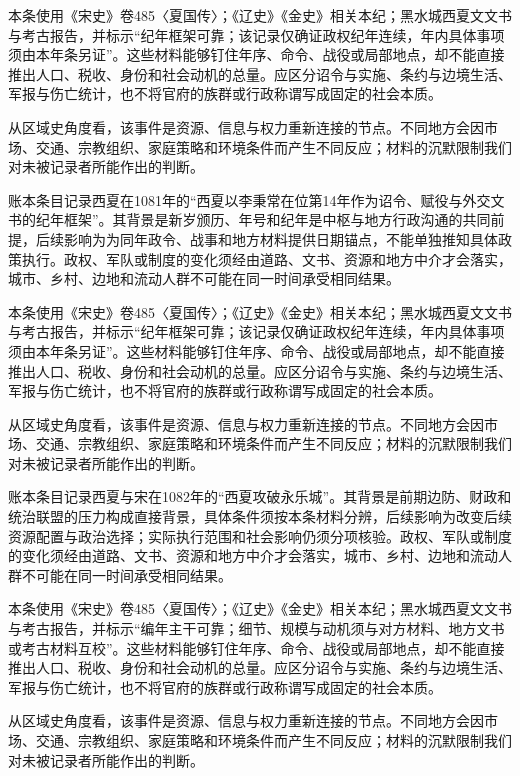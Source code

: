 本条使用《宋史》卷485〈夏国传〉；《辽史》《金史》相关本纪；黑水城西夏文文书与考古报告，并标示“纪年框架可靠；该记录仅确证政权纪年连续，年内具体事项须由本年条另证”。这些材料能够钉住年序、命令、战役或局部地点，却不能直接推出人口、税收、身份和社会动机的总量。应区分诏令与实施、条约与边境生活、军报与伤亡统计，也不将官府的族群或行政称谓写成固定的社会本质。

从区域史角度看，该事件是资源、信息与权力重新连接的节点。不同地方会因市场、交通、宗教组织、家庭策略和环境条件而产生不同反应；材料的沉默限制我们对未被记录者所能作出的判断。

账本条目记录西夏在1081年的“西夏以李秉常在位第14年作为诏令、赋役与外交文书的纪年框架”。其背景是新岁颁历、年号和纪年是中枢与地方行政沟通的共同前提，后续影响为为同年政令、战事和地方材料提供日期锚点，不能单独推知具体政策执行。政权、军队或制度的变化须经由道路、文书、资源和地方中介才会落实，城市、乡村、边地和流动人群不可能在同一时间承受相同结果。

本条使用《宋史》卷485〈夏国传〉；《辽史》《金史》相关本纪；黑水城西夏文文书与考古报告，并标示“纪年框架可靠；该记录仅确证政权纪年连续，年内具体事项须由本年条另证”。这些材料能够钉住年序、命令、战役或局部地点，却不能直接推出人口、税收、身份和社会动机的总量。应区分诏令与实施、条约与边境生活、军报与伤亡统计，也不将官府的族群或行政称谓写成固定的社会本质。

从区域史角度看，该事件是资源、信息与权力重新连接的节点。不同地方会因市场、交通、宗教组织、家庭策略和环境条件而产生不同反应；材料的沉默限制我们对未被记录者所能作出的判断。

账本条目记录西夏与宋在1082年的“西夏攻破永乐城”。其背景是前期边防、财政和统治联盟的压力构成直接背景，具体条件须按本条材料分辨，后续影响为改变后续资源配置与政治选择；实际执行范围和社会影响仍须分项核验。政权、军队或制度的变化须经由道路、文书、资源和地方中介才会落实，城市、乡村、边地和流动人群不可能在同一时间承受相同结果。

本条使用《宋史》卷485〈夏国传〉；《辽史》《金史》相关本纪；黑水城西夏文文书与考古报告，并标示“编年主干可靠；细节、规模与动机须与对方材料、地方文书或考古材料互校”。这些材料能够钉住年序、命令、战役或局部地点，却不能直接推出人口、税收、身份和社会动机的总量。应区分诏令与实施、条约与边境生活、军报与伤亡统计，也不将官府的族群或行政称谓写成固定的社会本质。

从区域史角度看，该事件是资源、信息与权力重新连接的节点。不同地方会因市场、交通、宗教组织、家庭策略和环境条件而产生不同反应；材料的沉默限制我们对未被记录者所能作出的判断。

